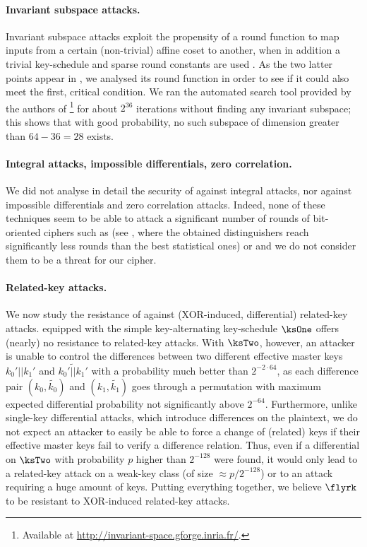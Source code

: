\paragraph{Invariant subspace attacks.}
Invariant subspace attacks exploit the propensity of a round function to map inputs from a certain (non-trivial) affine coset to another, when in addition a trivial key-schedule and sparse round constants are used \cite{briceinv}.
As the two latter points appear in \fly, we analysed its round function in order to see if it could also meet the first, critical condition.
We ran the automated search tool provided by the authors of \cite{briceinv}\footnote{Available at \url{http://invariant-space.gforge.inria.fr/}.}
for about $2^{36}$ iterations without finding any invariant subspace; this shows that with good probability, no such subspace of dimension greater than $64 - 36 = 28$ exists.

\paragraph{Integral attacks, impossible differentials, zero correlation.}
We did not analyse in detail the security of \fly against integral attacks, nor against impossible differentials and zero correlation
attacks. Indeed, none of these techniques seem to be able to attack a significant number of rounds of bit-oriented ciphers such as \present
(see \eg \cite{bitintegral,presentzero,newdivision}, where the obtained distinguishers reach significantly less rounds than the best statistical ones)
or \fly and we do not consider them to be a threat
for our cipher.

\paragraph{Related-key attacks.}
We now study the resistance of \fly against (XOR-induced, differential) related-key attacks.
\fly equipped with the simple key-alternating key-schedule $\ksOne$ offers (nearly) no resistance to related-key attacks. With $\ksTwo$, however, an attacker is unable to control the
differences between two different effective master keys $k_0'||k_1'$ and $\widetilde{k_0'||k_1'}$ with a probability much better than $2^{-2\cdot64}$, as each difference pair $(k_0,\widetilde{k_0})$
and $(k_1,\widetilde{k_1})$ goes through a permutation with maximum expected differential probability not significantly above $2^{-64}$. Furthermore, unlike single-key differential attacks, which introduce differences
on the plaintext, we do not expect an attacker to easily be able to force a change of (related) keys
if their effective master keys fail to verify a difference relation. Thus, even
if a differential on $\ksTwo$ with probability $p$ higher than $2^{-128}$ were found, it would only lead to a related-key attack on a weak-key class 
	(of size $\approx p/2^{-128}$) or to an attack requiring a huge amount of keys.
Putting everything together, we believe $\flyrk$ to be resistant to XOR-induced related-key attacks.

